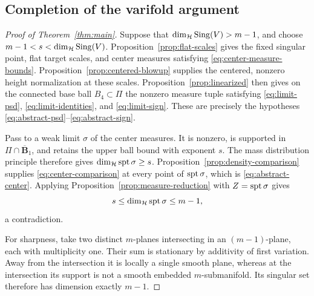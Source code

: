 \subsection{Completion of the varifold argument}

\begin{proof}[Proof of Theorem~\ref{thm:main}]
Suppose that $\dim_{\mathcal H}\operatorname{Sing}(V)>m-1$, and choose
$m-1<s<\dim_{\mathcal H}\operatorname{Sing}(V)$. Proposition~\ref{prop:flat-scales}
gives the fixed singular point, flat target scales, and center
measures satisfying \eqref{eq:center-measure-bounds}.
Proposition~\ref{prop:centered-blowup} supplies the centered,
nonzero height normalization at these scales.
Proposition~\ref{prop:linearized} then gives on the connected base
ball $B_4\subset\Pi$ the nonzero measure tuple satisfying
\eqref{eq:limit-psd}, \eqref{eq:limit-identities}, and
\eqref{eq:limit-sign}. These are precisely the hypotheses
\eqref{eq:abstract-psd}--\eqref{eq:abstract-sign}.

Pass to a weak limit $\sigma$ of the center measures. It is nonzero,
is supported in $\Pi\cap\overline{\mathbf B}_1$, and retains the
upper ball bound with exponent $s$. The mass distribution principle
therefore gives
$\dim_{\mathcal H}\operatorname{spt}\sigma\ge s$.
Proposition~\ref{prop:density-comparison} supplies
\eqref{eq:center-comparison} at every point of $\operatorname{spt}\sigma$,
which is \eqref{eq:abstract-center}. Applying
Proposition~\ref{prop:measure-reduction} with
$Z=\operatorname{spt}\sigma$ gives
\[
 s\le\dim_{\mathcal H}\operatorname{spt}\sigma\le m-1,
\]
a contradiction.

For sharpness, take two distinct $m$-planes intersecting in an
$(m-1)$-plane, each with multiplicity one. Their sum is stationary
by additivity of first variation. Away from the intersection it is
locally a single smooth plane, whereas at the intersection its
support is not a smooth embedded $m$-submanifold. Its singular set
therefore has dimension exactly $m-1$.
\end{proof}
